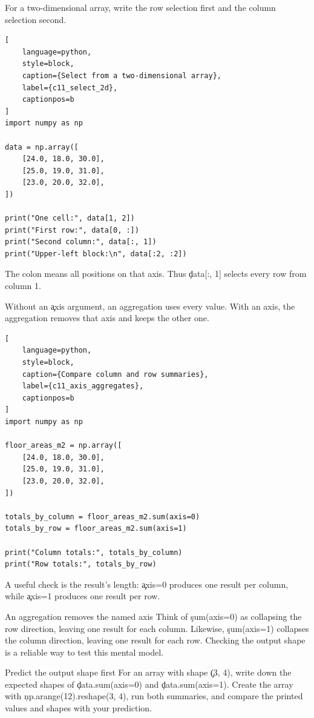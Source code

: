 For a two-dimensional array, write the row selection first and the column
selection second.

\begin{lstlisting}[
    language=python,
    style=block,
    caption={Select from a two-dimensional array},
    label={c11_select_2d},
    captionpos=b
]
import numpy as np

data = np.array([
    [24.0, 18.0, 30.0],
    [25.0, 19.0, 31.0],
    [23.0, 20.0, 32.0],
])

print("One cell:", data[1, 2])
print("First row:", data[0, :])
print("Second column:", data[:, 1])
print("Upper-left block:\n", data[:2, :2])
\end{lstlisting}

The colon means all positions on that axis. Thus \c{data[:, 1]} selects every
row from column 1.


Without an \c{axis} argument, an aggregation uses every value. With an axis,
the aggregation removes that axis and keeps the other one.

\begin{lstlisting}[
    language=python,
    style=block,
    caption={Compare column and row summaries},
    label={c11_axis_aggregates},
    captionpos=b
]
import numpy as np

floor_areas_m2 = np.array([
    [24.0, 18.0, 30.0],
    [25.0, 19.0, 31.0],
    [23.0, 20.0, 32.0],
])

totals_by_column = floor_areas_m2.sum(axis=0)
totals_by_row = floor_areas_m2.sum(axis=1)

print("Column totals:", totals_by_column)
print("Row totals:", totals_by_row)
\end{lstlisting}

A useful check is the result's length: \c{axis=0} produces one result per
column, while \c{axis=1} produces one result per row.

\begin{ExplainBox}{An aggregation removes the named axis}
Think of \c{sum(axis=0)} as collapsing the row direction, leaving one result
for each column. Likewise, \c{sum(axis=1)} collapses the column direction,
leaving one result for each row. Checking the output shape is a reliable way
to test this mental model.
\end{ExplainBox}

\begin{TryBox}{Predict the output shape first}
For an array with shape \c{(3, 4)}, write down the expected shapes of
\c{data.sum(axis=0)} and \c{data.sum(axis=1)}. Create the array with
\c{np.arange(12).reshape(3, 4)}, run both summaries, and compare the printed
values and shapes with your prediction.
\end{TryBox}

